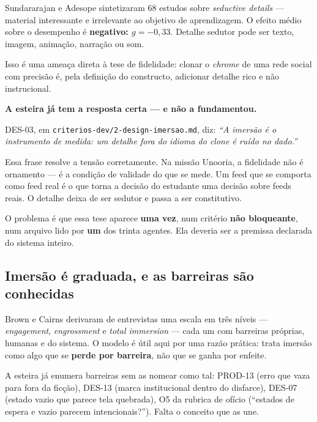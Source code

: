 \documentclass[11pt,a4paper]{article}
\begin{document}
Sundararajan e Adesope \cite{sundararajan2020} sintetizaram 68 estudos sobre \emph{seductive
details} --- material interessante e irrelevante ao objetivo de aprendizagem. O efeito m\'edio
sobre o desempenho \'e \textbf{negativo: $g = -0{,}33$}. Detalhe sedutor pode ser texto, imagem,
anima\c{c}\~ao, narra\c{c}\~ao ou som.

Isso \'e uma amea\c{c}a direta \`a tese de fidelidade: clonar o \emph{chrome} de uma rede social
com precis\~ao \'e, pela defini\c{c}\~ao do constructo, adicionar detalhe rico e n\~ao
instrucional.

\begin{tesebox}
\textbf{A esteira j\'a tem a resposta certa --- e n\~ao a fundamentou.}

DES-03, em \texttt{criterios-dev/2-design-imersao.md}, diz: \emph{``A imers\~ao \'e o instrumento
de medida: um detalhe fora do idioma do clone \'e ru\'ido no dado.''}

Essa frase resolve a tens\~ao corretamente. Na miss\~ao Unooria, a fidelidade n\~ao \'e ornamento
--- \'e a condi\c{c}\~ao de validade do que se mede. Um feed que se comporta como feed real \'e o
que torna a decis\~ao do estudante uma decis\~ao sobre feeds reais. O detalhe deixa de ser sedutor
e passa a ser constitutivo.

O problema \'e que essa tese aparece \textbf{uma vez}, num crit\'erio \textbf{n\~ao bloqueante},
num arquivo lido por \textbf{um} dos trinta agentes. Ela deveria ser a premissa declarada do
sistema inteiro.
\end{tesebox}

\subsection{Imers\~ao \'e graduada, e as barreiras s\~ao conhecidas}

Brown e Cairns \cite{brown2004} derivaram de entrevistas uma escala em tr\^es n\'iveis ---
\emph{engagement}, \emph{engrossment} e \emph{total immersion} --- cada um com barreiras
pr\'oprias, humanas e do sistema. O modelo \'e \'util aqui por uma raz\~ao pr\'atica: trata
imers\~ao como algo que se \textbf{perde por barreira}, n\~ao que se ganha por enfeite.

A esteira j\'a enumera barreiras sem as nomear como tal: PROD-13 (erro que vaza para fora da
fic\c{c}\~ao), DES-13 (marca institucional dentro do disfarce), DES-07 (estado vazio que parece
tela quebrada), O5 da rubrica de of\'icio (``estados de espera e vazio parecem intencionais?'').
Falta o conceito que as une.
\end{document}
